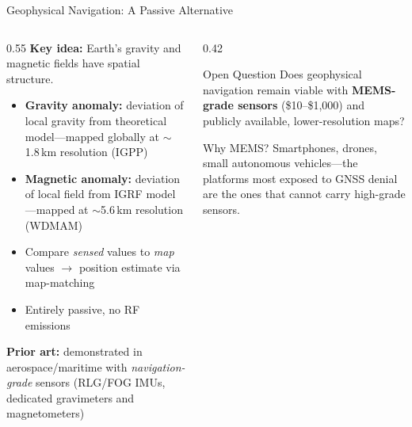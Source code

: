 \documentclass[aspectratio=169]{beamer}
\begin{document}
\begin{frame}{Geophysical Navigation: A Passive Alternative}
    \begin{columns}
        \begin{column}{0.55\textwidth}
            \textbf{Key idea:} Earth's gravity and magnetic fields have spatial structure.
            \vspace{0.5em}
            \begin{itemize}
                \item \textbf{Gravity anomaly:} deviation of local gravity from theoretical model---mapped globally at $\sim$1.8\,km resolution (IGPP)
                \item \textbf{Magnetic anomaly:} deviation of local field from IGRF model---mapped at $\sim$5.6\,km resolution (WDMAM)
                \item Compare \emph{sensed} values to \emph{map} values $\rightarrow$ position estimate via map-matching
                \item Entirely passive, no RF emissions
            \end{itemize}
            \vspace{0.5em}
            \textbf{Prior art:} demonstrated in aerospace/maritime with \emph{navigation-grade} sensors (RLG/FOG IMUs, dedicated gravimeters and magnetometers)
        \end{column}
        \begin{column}{0.42\textwidth}
            \begin{exampleblock}{Open Question}
                \small
                Does geophysical navigation remain viable with \textbf{MEMS-grade sensors} (\$10--\$1,000) and publicly available, lower-resolution maps?
            \end{exampleblock}
            \vspace{0.5em}
            \begin{block}{Why MEMS?}
                \small
                Smartphones, drones, small autonomous vehicles---the platforms most exposed to GNSS denial are the ones that cannot carry high-grade sensors.
            \end{block}
        \end{column}
    \end{columns}
\end{frame}
\end{document}
